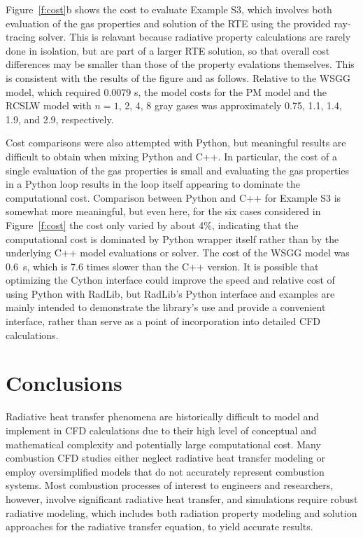 \documentclass[preprint,12pt]{elsarticle}
\begin{document}
Figure~\ref{f:cost}b shows the cost to evaluate Example S3, which involves both evaluation of the gas properties and solution of the RTE using the provided ray-tracing solver. This is relavant because radiative property calculations are rarely done in isolation, but are part of a larger RTE solution, so that overall cost differences may be smaller than those of the property evalations themselves. This is consistent with the results of the figure and as follows. Relative to the WSGG model, which required 0.0079 s, the model costs for the PM model and the RCSLW model with $n=1$, 2, 4, 8 gray gases was approximately 0.75, 1.1, 1.4, 1.9, and 2.9, respectively. 

Cost comparisons were also attempted with Python, but meaningful results are difficult to obtain when mixing Python and C++. In particular, the cost of a single evaluation of the gas properties is small and evaluating the gas properties in a Python loop results in the loop itself appearing to dominate the computational cost. Comparison between Python and C++ for Example S3 is somewhat more meaningful, but even here, for the six cases considered in Figure~\ref{f:cost} the cost only varied by about 4\%, indicating that the computational cost is dominated by Python wrapper itself rather than by the underlying C++ model evaluations or solver. The cost of the WSGG model was 0.6~s, which is 7.6 times slower than the C++ version. It is possible that optimizing the Cython interface could improve the speed and relative cost of using Python with RadLib, but RadLib's Python interface and examples are mainly intended to demonstrate the library's use and provide a convenient interface, rather than serve as a point of incorporation into detailed CFD calculations.%


\section{Conclusions} \label{s:conclusions}

Radiative heat transfer phenomena are historically difficult to model and implement in CFD calculations due to their high level of conceptual and mathematical complexity and potentially large computational cost. Many combustion CFD studies either neglect radiative heat transfer modeling or employ oversimplified models that do not accurately represent combustion systems. Most combustion processes of interest to engineers and researchers, however, involve significant radiative heat transfer, and simulations require robust radiative modeling, which includes both radiation property modeling and solution approaches for the radiative transfer equation, to yield accurate results. 
\end{document}
